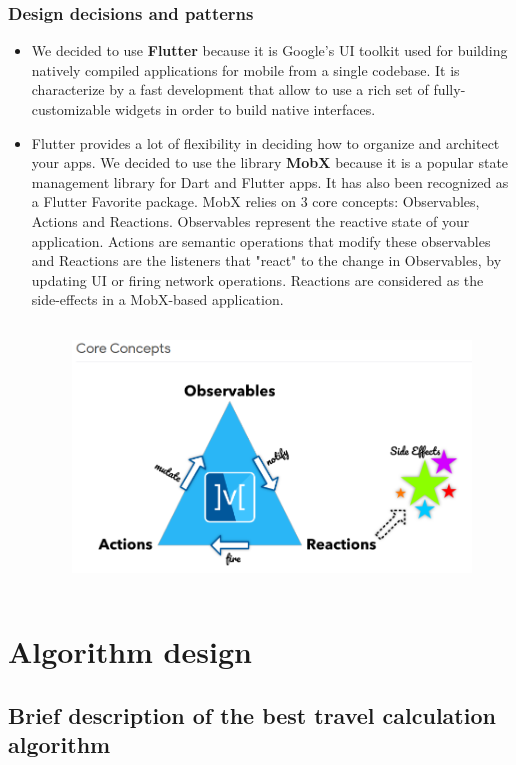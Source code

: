 \documentclass [12pt]{article}
\begin{document}
\subsubsection{Design decisions and patterns}
\begin{itemize}
\item We decided to use \textbf{Flutter} because it is Google’s UI toolkit used for building natively compiled applications for mobile from a single codebase. It is characterize by a fast development that allow to
use a rich set of fully-customizable widgets in order to build native interfaces.
\item Flutter provides a lot of flexibility in deciding how to organize and architect your apps. We decided to use the library \textbf{MobX} because it is a popular state management library for Dart and Flutter apps. It has also been recognized as a Flutter Favorite package.
MobX relies on 3 core concepts: Observables, Actions and Reactions. Observables represent the reactive state of your application. Actions are semantic operations that modify these observables and Reactions are the listeners that "react" to the change in Observables, by updating UI or firing network operations. Reactions are considered as the side-effects in a MobX-based application.
\begin{figure}[ht!]
\centering
\includegraphics[height=7cm, width=12cm]{MobX.png}
\end{figure}

\end{itemize}
\section{Algorithm design}

\subsection{Brief description of the best travel calculation algorithm}
\end{document}
